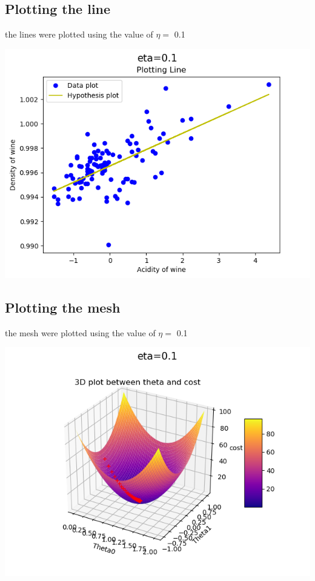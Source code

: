 \documentclass[10pt]{article}
\begin{document}
\subsection{Plotting the line}
the lines were plotted using the value of $\eta=$ 0.1
\\
\begin{center}
\includegraphics[scale=0.4]{linearplot01.png} 
\end{center}
\subsection{Plotting the mesh}
the mesh were plotted using the value of $\eta=$ 0.1
\\
\begin{center}
\includegraphics[scale=0.8]{meshplot01.png} 
\end{center}
\newpage
\end{document}
